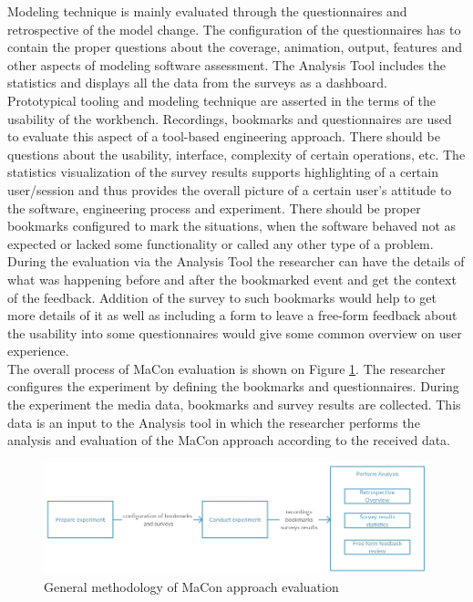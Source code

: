 Modeling technique is mainly evaluated through the questionnaires and retrospective of the model change. The configuration of the questionnaires has to contain the proper questions about the coverage, animation, output, features and other aspects of modeling software assessment. The Analysis Tool includes the statistics and displays all the data from the surveys as a dashboard.\\

Prototypical tooling and modeling technique are asserted in the terms of the usability of the workbench. Recordings, bookmarks and questionnaires are used to evaluate this aspect of a tool-based engineering approach. There should be questions about the usability, interface, complexity of certain operations, etc. The statistics visualization of the survey results supports highlighting of a certain user/session and thus provides the overall picture of a certain user's attitude to the software, engineering process and experiment. There should be proper bookmarks configured to mark the situations, when the software behaved not as expected or lacked some functionality or called any other type of a problem. During the evaluation via the Analysis Tool the researcher can have the details of what was happening before and after the bookmarked event and get the context of the feedback. Addition of the survey to such bookmarks would help to get more details of it as well as including a form to leave a free-form feedback about the usability into some questionnaires would give some common overview on user experience.\\

The overall process of MaCon evaluation is shown on Figure \ref{fig:process}. The researcher configures the experiment by defining the bookmarks and questionnaires. During the experiment the media data, bookmarks and survey results are collected. This data is an input to the Analysis tool in which the researcher performs the analysis and evaluation of the MaCon approach according to the received data. 

 \begin{figure}[htb]
 \centering
\includegraphics[width=\textwidth]{figures/process.jpg}
\caption{General methodology of MaCon approach evaluation}
\label{fig:process}
 \end{figure}

